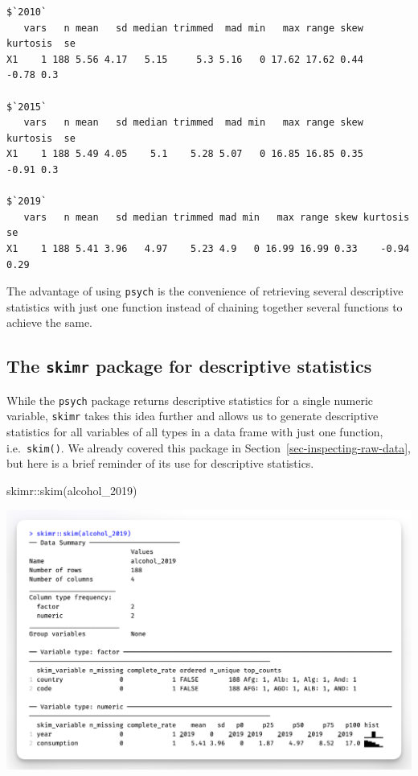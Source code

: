 \documentclass[
  letterpaper,
  DIV=11,
  numbers=noendperiod]{scrreprt}
\newenvironment{Shaded}{\begin{snugshade}}{\end{snugshade}}
\newcommand{\FunctionTok}[1]{\textcolor[rgb]{0.28,0.35,0.67}{#1}}
\newcommand{\NormalTok}[1]{\textcolor[rgb]{0.00,0.23,0.31}{#1}}
\newcommand{\SpecialCharTok}[1]{\textcolor[rgb]{0.37,0.37,0.37}{#1}}
\begin{document}
\begin{verbatim}
$`2010`
   vars   n mean   sd median trimmed  mad min   max range skew kurtosis  se
X1    1 188 5.56 4.17   5.15     5.3 5.16   0 17.62 17.62 0.44    -0.78 0.3

$`2015`
   vars   n mean   sd median trimmed  mad min   max range skew kurtosis  se
X1    1 188 5.49 4.05    5.1    5.28 5.07   0 16.85 16.85 0.35    -0.91 0.3

$`2019`
   vars   n mean   sd median trimmed mad min   max range skew kurtosis   se
X1    1 188 5.41 3.96   4.97    5.23 4.9   0 16.99 16.99 0.33    -0.94 0.29
\end{verbatim}

The advantage of using \texttt{psych} is the convenience of retrieving
several descriptive statistics with just one function instead of
chaining together several functions to achieve the same.

\subsection{\texorpdfstring{The \texttt{skimr} package for descriptive
statistics}{The skimr package for descriptive statistics}}\label{sec-skimr-package}

While the \texttt{psych} package returns descriptive statistics for a
single numeric variable, \texttt{skimr} takes this idea further and
allows us to generate descriptive statistics for all variables of all
types in a data frame with just one function, i.e.~\texttt{skim()}. We
already covered this package in Section~\ref{sec-inspecting-raw-data},
but here is a brief reminder of its use for descriptive statistics.

\begin{Shaded}
\begin{Highlighting}[]
\NormalTok{skimr}\SpecialCharTok{::}\FunctionTok{skim}\NormalTok{(alcohol\_2019)}
\end{Highlighting}
\end{Shaded}

\includegraphics{images/chapter_08_img/output_skim.png}
\end{document}
